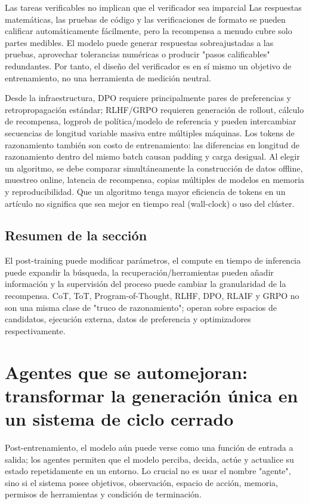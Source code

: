 \documentclass[a4paper]{article}
\begin{document}
\begin{warningbox}{Las tareas verificables no implican que el verificador sea imparcial}
Las respuestas matemáticas, las pruebas de código y las verificaciones de formato se pueden calificar automáticamente fácilmente, pero la recompensa a menudo cubre solo partes medibles. El modelo puede generar respuestas sobreajustadas a las pruebas, aprovechar tolerancias numéricas o producir "pasos calificables" redundantes. Por tanto, el diseño del verificador es en sí mismo un objetivo de entrenamiento, no una herramienta de medición neutral.
\end{warningbox}

Desde la infraestructura, DPO requiere principalmente pares de preferencias y retropropagación estándar; RLHF/GRPO requieren generación de rollout, cálculo de recompensa, logprob de política/modelo de referencia y pueden intercambiar secuencias de longitud variable masiva entre múltiples máquinas. Los tokens de razonamiento también son costo de entrenamiento: las diferencias en longitud de razonamiento dentro del mismo batch causan padding y carga desigual. Al elegir un algoritmo, se debe comparar simultáneamente la construcción de datos offline, muestreo online, latencia de recompensa, copias múltiples de modelos en memoria y reproducibilidad. Que un algoritmo tenga mayor eficiencia de tokens en un artículo no significa que sea mejor en tiempo real (wall-clock) o uso del clúster.

\subsection{Resumen de la sección}

El post-training puede modificar parámetros, el compute en tiempo de inferencia puede expandir la búsqueda, la recuperación/herramientas pueden añadir información y la supervisión del proceso puede cambiar la granularidad de la recompensa. CoT, ToT, Program-of-Thought, RLHF, DPO, RLAIF y GRPO no son una misma clase de "truco de razonamiento"; operan sobre espacios de candidatos, ejecución externa, datos de preferencia y optimizadores respectivamente.
\section{Agentes que se automejoran: transformar la generación única en un sistema de ciclo cerrado}

Post-entrenamiento, el modelo aún puede verse como una función de entrada a salida; los agentes permiten que el modelo perciba, decida, actúe y actualice su estado repetidamente en un entorno. Lo crucial no es usar el nombre "agente", sino si el sistema posee objetivos, observación, espacio de acción, memoria, permisos de herramientas y condición de terminación.
\end{document}
